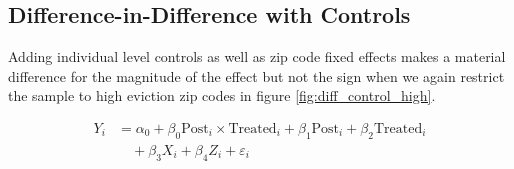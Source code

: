 \documentclass[a4paper,12pt]{article}
\begin{document}
\subsection{Difference-in-Difference with Controls}
Adding individual level controls as well as zip code fixed effects makes a material difference for the magnitude of the effect but not the sign when we again restrict the sample to high eviction zip codes in figure \ref{fig:diff_control_high}.


\begin{align*}
    Y_i &= \alpha _0 + \beta_0 \textrm{Post}_i \times \textrm{Treated}_i + \beta_1  \textrm{Post}_i + \beta_2 \textrm{Treated}_i \\ 
    &\quad + \beta _3X_i + \beta_4 Z_i + \varepsilon_i
\end{align*}
\end{document}
